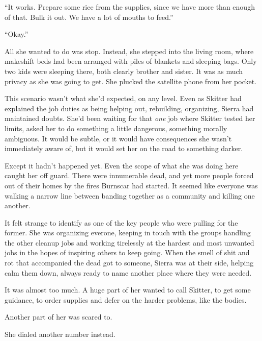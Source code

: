 ``It works.  Prepare some rice from the supplies, since we have more than enough of that.  Bulk it out.  We have a lot of mouths to feed.''



``Okay.''



All she wanted to do was stop.  Instead, she stepped into the living room, where makeshift beds had been arranged with piles of blankets and sleeping bags.  Only two kids were sleeping there, both clearly brother and sister.  It was as much privacy as she was going to get.  She plucked the satellite phone from her pocket.



This scenario wasn't what she'd expected, on any level.  Even as Skitter had explained the job duties as being helping out, rebuilding, organizing, Sierra had maintained doubts.  She'd been waiting for that \emph{one} job where Skitter tested her limits, asked her to do something a little dangerous, something morally ambiguous.  It would be subtle, or it would have consequences she wasn't immediately aware of, but it would set her on the road to something darker.



Except it hadn't happened yet.  Even the scope of what she was doing here caught her off guard.  There were innumerable dead, and yet more people forced out of their homes by the fires Burnscar had started.  It seemed like everyone was walking a narrow line between banding together as a community and killing one another.



It felt strange to identify as one of the key people who were pulling for the former.  She was organizing everone, keeping in touch with the groups handling the other cleanup jobs and working tirelessly at the hardest and most unwanted jobs in the hopes of inspiring others to keep going.  When the smell of shit and rot that accompanied the dead got to someone, Sierra was at their side, helping calm them down, always ready to name another place where they were needed.



It was almost too much.  A huge part of her wanted to call Skitter, to get some guidance, to order supplies and defer on the harder problems, like the bodies.



Another part of her was scared to.



She dialed another number instead.



